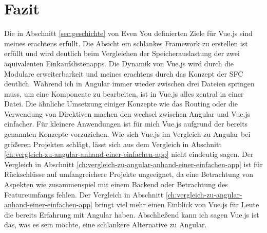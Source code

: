 

\chapter{Fazit}
Die in Abschnitt \ref{sec:geschichte} von Even You definierten Ziele für Vue.js sind meines erachtens erfüllt.
Die Absicht ein schlankes Framework zu erstellen ist erfüllt und wird deutlich beim Vergleichen der Speicherauslastung
der zwei äquivalenten Einkaufslistenapps.
Die Dynamik von Vue.js wird durch die Modulare erweiterbarkeit und meines erachtens durch das
Konzept der SFC deutlich.
Während ich in Angular immer wieder zwischen drei Dateien springen muss, um eine Komponente zu bearbeiten,
ist in Vue.js alles zentral in einer Datei.
Die ähnliche Umsetzung einiger Konzepte wie das Routing oder die Verwendung von Direktiven machen
den wechsel zwischen Angular und Vue.js einfacher.
Für kleinere Anwendungen ist für mich Vue.js aufgrund der bereits genannten Konzepte vorzuziehen.
Wie sich Vue.js im Vergleich zu Angular bei größeren Projekten schlägt, lässt sich aus dem Vergleich
in Abschnitt \ref{ch:vergleich-zu-angular-anhand-einer-einfachen-app} nicht eindeutig sagen.
Der Vergleich in Abschnitt \ref{ch:vergleich-zu-angular-anhand-einer-einfachen-app} ist für Rückschlüsse
auf umfangreichere Projekte ungeeignet, da eine Betrachtung von Aspekten wie zusammenspiel mit einem Backend
oder Betrachtung des Featureumfangs fehlen.
Der Vergleich in Abschnitt \ref{ch:vergleich-zu-angular-anhand-einer-einfachen-app} bringt viel mehr einen
Einblick von Vue.js für Leute die bereits Erfahrung mit Angular haben.
Abschließend kann ich sagen Vue.js ist das, was es sein möchte, eine schlankere Alternative zu Angular.

